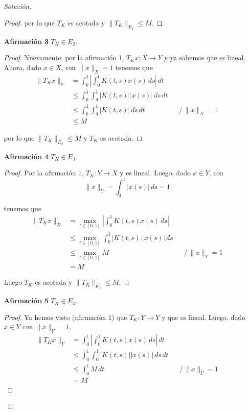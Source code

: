 \documentclass[duedate = 11 de Septiembre, 
			ramo = An\'alisis Funcional, 
			doctype = Tarea 1,
			semester = 2,
			year = 2017]{tarea}
\begin{document}
\begin{enumerate}[(i)]
\begin{proof}[Solución]
\begin{proof}
	por lo que $T_{K}$ es acotada y $\|T_{K}\|_{E_{1}} \leq M$.
	\end{proof}

	\textbf{Afirmación 3} $T_{K} \in E_{2}$.
		
	\begin{proof} Nuevamente, por la afirmación 1, $T_{K}x : X \to Y$ y ya sabemos que es lineal. Ahora, dado $x \in X$, con $\|x\|_{X} = 1$ tenemos que
		\[ \begin{aligned}
			\|T_{K}x\|_{Y}
				&=	\int_{0}^{1} \left| \int_{0}^{1} K(t,s)x(s) \, ds \right| \, dt	\\
				&\leq	\int_{0}^{1} \int_{0}^{1} |K(t,s)| |x(s)| \, ds \, dt	\\
				&\leq	\int_{0}^{1} \int_{0}^{1} |K(t,s)| \, ds \, dt	&&\big/ \, \|x\|_{X} = 1	\\
				&\leq	M
		\end{aligned} \tag{3.2} \]
	
	por lo que $\|T_{K}\|_{E_{2}} \leq M$ y $T_{K}$ es acotada.
	\end{proof}

	\newpage
	\textbf{Afirmación 4} $T_{K} \in E_{3}$.
		
	\begin{proof} Por la afirmación 1, $T_{K}: Y \to X$ y es lineal. Luego, dado $x \in Y$, con 
		$$\|x\|_{Y} = \int_{0}^{1} |x(s)| \, ds = 1$$
		
	tenemos que
		\[ \begin{aligned}
			\|T_{K}x\|_{X}
				&=	\max_{t \in [0,1]} \left| \int_{0}^{1} K(t,s)x(s) \, ds \right|	\\
				&\leq	\max_{t \in [0,1]} \int_{0}^{1} |K(t,s)||x(s)| \, ds	\\
				&\leq	\max_{t \in [0,1]} M	&&\big/ \, \|x\|_{Y} = 1	\\
				&=	M
		\end{aligned} \tag{3.3} \]
		
	Luego $T_{K}$ es acotada y $\|T_{K}\|_{E_{3}} \leq M$.
	\end{proof}
	
	\textbf{Afirmación 5} $T_{K} \in E_{4}$.
	
	\begin{proof} Ya hemos visto (afirmación 1) que $T_{K}: Y \to Y$ y que es lineal. Luego, dado $x \in Y$ con $\|x\|_{Y} = 1$,
		\[ \begin{aligned}
			\|T_{K}x\|_{Y}
				&=	\int_{0}^{1} \left| \int_{0}^{1} K(t,s)x(s) \, ds \right| \, dt	\\
				&\leq	\int_{0}^{1} \int_{0}^{1} |K(t,s)| |x(s)| \, ds \, dt	\\
				&\leq	\int_{0}^{1} M \, dt										&&\big/\,  \|x\|_{Y} = 1	\\
				&=	M
		\end{aligned} \tag{3.4}\]
	

\end{proof}
\end{proof}
\end{enumerate}
\end{document}
